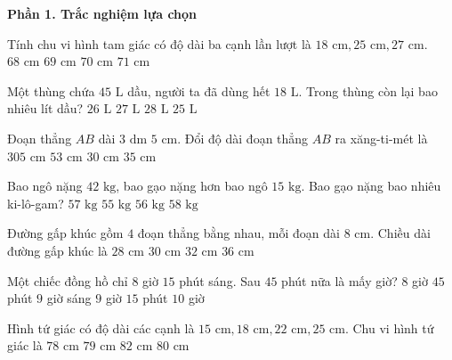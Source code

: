 \textbf{Phần 1. Trắc nghiệm lựa chọn}

\begin{ex} %
Tính chu vi hình tam giác có độ dài ba cạnh lần lượt là $18\text{ cm}, 25\text{ cm}, 27\text{ cm}$.
\choice
{$68\text{ cm}$}
{$69\text{ cm}$}
{\True $70\text{ cm}$}
{$71\text{ cm}$}
\end{ex}

\begin{ex} %
Một thùng chứa $45\text{ L}$ dầu, người ta đã dùng hết $18\text{ L}$. Trong thùng còn lại bao nhiêu lít dầu?
\choice
{$26\text{ L}$}
{\True $27\text{ L}$}
{$28\text{ L}$}
{$25\text{ L}$}
\end{ex}

\begin{ex} %
Đoạn thẳng $AB$ dài $3\text{ dm } 5\text{ cm}$. Đổi độ dài đoạn thẳng $AB$ ra xăng-ti-mét là
\choice
{$305\text{ cm}$}
{$53\text{ cm}$}
{$30\text{ cm}$}
{\True $35\text{ cm}$}
\end{ex}

\begin{ex} %
Bao ngô nặng $42\text{ kg}$, bao gạo nặng hơn bao ngô $15\text{ kg}$. Bao gạo nặng bao nhiêu ki-lô-gam?
\choice
{\True $57\text{ kg}$}
{$55\text{ kg}$}
{$56\text{ kg}$}
{$58\text{ kg}$}
\end{ex}

\begin{ex} %
Đường gấp khúc gồm $4$ đoạn thẳng bằng nhau, mỗi đoạn dài $8\text{ cm}$. Chiều dài đường gấp khúc là
\choice
{$28\text{ cm}$}
{$30\text{ cm}$}
{\True $32\text{ cm}$}
{$36\text{ cm}$}
\end{ex}

\begin{ex} %
Một chiếc đồng hồ chỉ $8$ giờ $15$ phút sáng. Sau $45$ phút nữa là mấy giờ?
\choice
{$8$ giờ $45$ phút}
{\True $9$ giờ sáng}
{$9$ giờ $15$ phút}
{$10$ giờ}
\end{ex}

\begin{ex} %
Hình tứ giác có độ dài các cạnh là $15\text{ cm}, 18\text{ cm}, 22\text{ cm}, 25\text{ cm}$. Chu vi hình tứ giác là
\choice
{$78\text{ cm}$}
{$79\text{ cm}$}
{$82\text{ cm}$}
{\True $80\text{ cm}$}
\end{ex}

